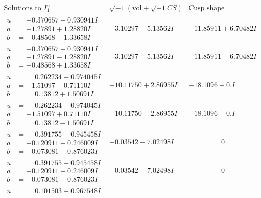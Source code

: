 \documentclass[1p]{elsarticle_modified}
\theoremstyle{definition}
\newcommand{\I}{\sqrt{-1}}
\begin{document}
$$\begin{array}{c|c|c}  
\text{Solutions to }I^u_{1}& \I (\text{vol} + \sqrt{-1}CS) & \text{Cusp shape}\\
 \hline 
\begin{aligned}
u &= -0.370657 + 0.930941 I \\
a &= -1.27891 + 1.28820 I \\
b &= -0.48568 - 1.33658 I\end{aligned}
 & -3.10297 - 5.13562 I & -11.85911 + 6.70482 I \\ \hline\begin{aligned}
u &= -0.370657 - 0.930941 I \\
a &= -1.27891 - 1.28820 I \\
b &= -0.48568 + 1.33658 I\end{aligned}
 & -3.10297 + 5.13562 I & -11.85911 - 6.70482 I \\ \hline\begin{aligned}
u &= \phantom{-}0.262234 + 0.974045 I \\
a &= -1.51097 - 0.71110 I \\
b &= \phantom{-}0.13812 + 1.50691 I\end{aligned}
 & -10.11750 + 2.86955 I & -18.1096 + 0. I\phantom{ +0.000000I} \\ \hline\begin{aligned}
u &= \phantom{-}0.262234 - 0.974045 I \\
a &= -1.51097 + 0.71110 I \\
b &= \phantom{-}0.13812 - 1.50691 I\end{aligned}
 & -10.11750 - 2.86955 I & -18.1096 + 0. I\phantom{ +0.000000I} \\ \hline\begin{aligned}
u &= \phantom{-}0.391755 + 0.945458 I \\
a &= -0.120911 + 0.246009 I \\
b &= -0.073081 - 0.876023 I\end{aligned}
 & -0.03542 + 7.02498 I & \phantom{-0.000000 } 0 \\ \hline\begin{aligned}
u &= \phantom{-}0.391755 - 0.945458 I \\
a &= -0.120911 - 0.246009 I \\
b &= -0.073081 + 0.876023 I\end{aligned}
 & -0.03542 - 7.02498 I & \phantom{-0.000000 } 0 \\ \hline\begin{aligned}
u &= \phantom{-}0.101503 + 0.967548 I \\

\end{aligned}
\end{array}$$
\end{document}
